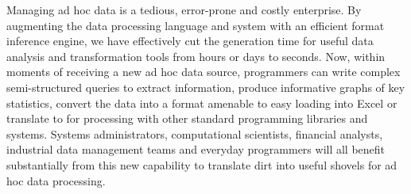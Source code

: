 Managing ad hoc data is a tedious, error-prone and costly enterprise.
By augmenting the \pads{} data processing language and system with an
efficient format inference engine, we have effectively cut the
generation time for useful data analysis and transformation tools from
hours or days to seconds.  Now, within moments of receiving a new ad
hoc data source, programmers can write complex semi-structured queries
to extract information, produce informative graphs of key statistics,
convert the data into a format amenable to easy loading into
Excel or translate to \xml{} for processing with other
standard programming libraries and systems.  Systems administrators,
computational scientists, financial analysts, industrial data
management teams and everyday programmers will all benefit
substantially from this new capability to translate dirt into useful
shovels for ad hoc data processing.
